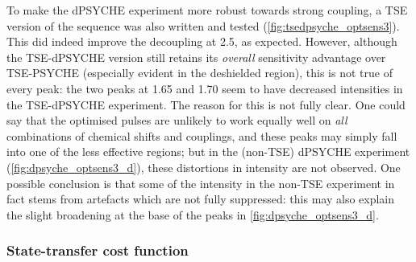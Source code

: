 To make the dPSYCHE experiment more robust towards strong coupling, a TSE version of the sequence was also written and tested (\cref{fig:tsedpsyche_optsens3}).
This did indeed improve the decoupling at \qty{2.5}{\ppm}, as expected.
However, although the TSE-dPSYCHE version still retains its \textit{overall} sensitivity advantage over TSE-PSYCHE (especially evident in the deshielded region), this is not true of every peak: the two peaks at 1.65 and \qty{1.70}{\ppm} seem to have decreased intensities in the TSE-dPSYCHE experiment.
The reason for this is not fully clear.
One could say that the optimised pulses are unlikely to work equally well on \textit{all} combinations of chemical shifts and couplings, and these peaks may simply fall into one of the less effective regions; but in the (non-TSE) dPSYCHE experiment (\cref{fig:dpsyche_optsens3_d}), these distortions in intensity are not observed.
One possible conclusion is that some of the intensity in the non-TSE experiment in fact stems from artefacts which are not fully suppressed: this may also explain the slight broadening at the base of the peaks in \cref{fig:dpsyche_optsens3_d}.


\iffalse
I then ran several preliminary screens to decide on the number of pulses to include in the pulse sequence.
Here, the 8-chunk cost function was used.
To save time, the total number of function evaluations was capped at 600 times the number of pulses: this, together with the fact that only one optimisation per category was run, means that these results are more suggestive rather than conclusive.
(Since the BFGS algorithm is a local optimiser, and the trajectory depends quite strongly on the initial point, the optimisation should \textit{in theory} be run with several different initial points.)
There was no clear winner, but the optimisations with 9 and 15 pulses yielded the best results; since optimising 18 parameters is easier than 30, I opted to go with 9 pulses.

\begin{figure}[htb]
    \centering
    \texttt{[image: pureshift/opt\_npulses.png]}%
    \caption[Comparison of cost functions attained with different numbers of pulses]{Blah}
    \label{fig:dpsyche_opt_npulses}
\end{figure}
\fi


\subsubsection{State-transfer cost function}

